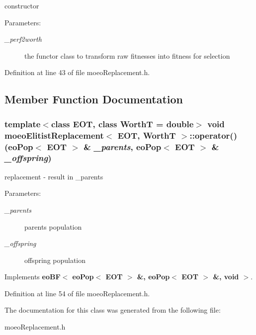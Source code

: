 constructor 

\begin{Desc}
\item[Parameters:]
\begin{description}
\item[{\em \_\-perf2worth}]the functor class to transform raw fitnesses into fitness for selection \end{description}
\end{Desc}


Definition at line 43 of file moeo\-Replacement.h.

\subsection{Member Function Documentation}
\subsubsection{\setlength{\rightskip}{0pt plus 5cm}template$<$class EOT, class Worth\-T = double$>$ void {\bf moeo\-Elitist\-Replacement}$<$ EOT, Worth\-T $>$::operator() ({\bf eo\-Pop}$<$ EOT $>$ \& {\em \_\-parents}, {\bf eo\-Pop}$<$ EOT $>$ \& {\em \_\-offspring})\hspace{0.3cm}{\tt  [inline, virtual]}}\label{classmoeoElitistReplacement_aad627deb45859e65ace0709c004049a}


replacement - result in \_\-parents 

\begin{Desc}
\item[Parameters:]
\begin{description}
\item[{\em \_\-parents}]parents population \item[{\em \_\-offspring}]offspring population \end{description}
\end{Desc}


Implements {\bf eo\-BF$<$ eo\-Pop$<$ EOT $>$ \&, eo\-Pop$<$ EOT $>$ \&, void $>$}.

Definition at line 54 of file moeo\-Replacement.h.

The documentation for this class was generated from the following file:\begin{CompactItemize}
\item 
moeo\-Replacement.h\end{CompactItemize}

